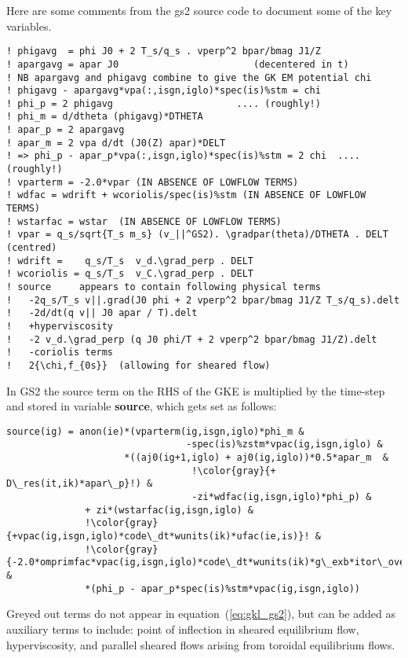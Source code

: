 \documentclass[10pt,a4paper]{article}
\newcommand{\grad}{{\bfm \nabla}}
\newcommand{\bfm}[1]{\mbox{{\boldmath $ { #1}$}}}
\newcommand{\gradpar}{\nabla_{\parallel}}
\begin{document}
Here are some comments from the gs2 source code to document some of the key
variables.
\begin{lstlisting}[caption={Comments documenting some key GS2 variables that set source.}]
! phigavg  = phi J0 + 2 T_s/q_s . vperp^2 bpar/bmag J1/Z
! apargavg = apar J0                        (decentered in t) 
! NB apargavg and phigavg combine to give the GK EM potential chi
! phigavg - apargavg*vpa(:,isgn,iglo)*spec(is)%stm = chi
! phi_p = 2 phigavg                      .... (roughly!)
! phi_m = d/dtheta (phigavg)*DTHETA 
! apar_p = 2 apargavg  
! apar_m = 2 vpa d/dt (J0(Z) apar)*DELT
! => phi_p - apar_p*vpa(:,isgn,iglo)*spec(is)%stm = 2 chi  .... (roughly!)  
! vparterm = -2.0*vpar (IN ABSENCE OF LOWFLOW TERMS)
! wdfac = wdrift + wcoriolis/spec(is)%stm (IN ABSENCE OF LOWFLOW TERMS)
! wstarfac = wstar  (IN ABSENCE OF LOWFLOW TERMS)
! vpar = q_s/sqrt{T_s m_s} (v_||^GS2). \gradpar(theta)/DTHETA . DELT (centred)
! wdrift =    q_s/T_s  v_d.\grad_perp . DELT 
! wcoriolis = q_s/T_s  v_C.\grad_perp . DELT 
! source     appears to contain following physical terms
!   -2q_s/T_s v||.grad(J0 phi + 2 vperp^2 bpar/bmag J1/Z T_s/q_s).delt 
!   -2d/dt(q v|| J0 apar / T).delt
!   +hyperviscosity
!   -2 v_d.\grad_perp (q J0 phi/T + 2 vperp^2 bpar/bmag J1/Z).delt 
!   -coriolis terms
!   2{\chi,f_{0s}}  (allowing for sheared flow)
\end{lstlisting}

In GS2 the source term on the RHS of the GKE is multiplied by the time-step
and stored in variable {\bf source}, which gets set as follows:
\begin{lstlisting}[escapechar=!]
 source(ig) = anon(ie)*(vparterm(ig,isgn,iglo)*phi_m & 
                                -spec(is)%zstm*vpac(ig,isgn,iglo) &
                     *((aj0(ig+1,iglo) + aj0(ig,iglo))*0.5*apar_m  &
                                 !\color{gray}{+ D\_res(it,ik)*apar\_p}!) &
                                 -zi*wdfac(ig,isgn,iglo)*phi_p) &
              + zi*(wstarfac(ig,isgn,iglo) &
              !\color{gray}{+vpac(ig,isgn,iglo)*code\_dt*wunits(ik)*ufac(ie,is)}! &
              !\color{gray}{-2.0*omprimfac*vpac(ig,isgn,iglo)*code\_dt*wunits(ik)*g\_exb*itor\_over\_B(ig)/spec(is)\%stm}!) &
              *(phi_p - apar_p*spec(is)%stm*vpac(ig,isgn,iglo))
\end{lstlisting}
Greyed out terms do not appear in equation~(\ref{eq:gkl_gs2}), but can be
added as auxiliary terms to include: point of inflection in sheared
equilibrium flow, hyperviscosity, and parallel sheared flows arising from
toroidal equilibrium flows.
\end{document}
